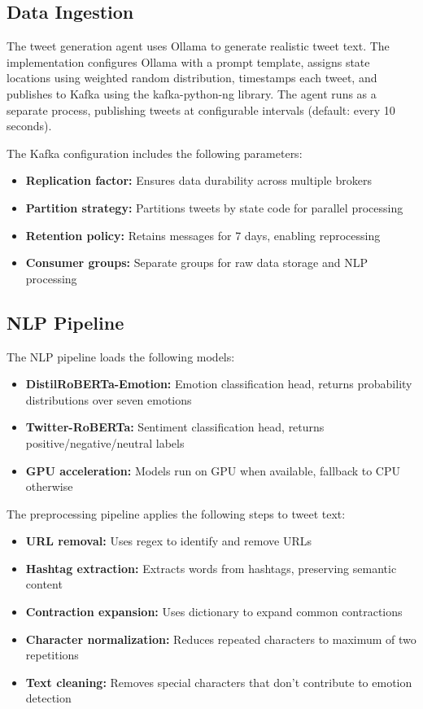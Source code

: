\subsection{Data Ingestion}

The tweet generation agent uses Ollama to generate realistic tweet text. The implementation configures Ollama with a prompt template, assigns state locations using weighted random distribution, timestamps each tweet, and publishes to Kafka using the kafka-python-ng library. The agent runs as a separate process, publishing tweets at configurable intervals (default: every 10 seconds).

The Kafka configuration includes the following parameters:

\begin{itemize}
\item \textbf{Replication factor:} Ensures data durability across multiple brokers
\item \textbf{Partition strategy:} Partitions tweets by state code for parallel processing
\item \textbf{Retention policy:} Retains messages for 7 days, enabling reprocessing
\item \textbf{Consumer groups:} Separate groups for raw data storage and NLP processing
\end{itemize}

\subsection{NLP Pipeline}

The NLP pipeline loads the following models:

\begin{itemize}
\item \textbf{DistilRoBERTa-Emotion:} Emotion classification head, returns probability distributions over seven emotions
\item \textbf{Twitter-RoBERTa:} Sentiment classification head, returns positive/negative/neutral labels
\item \textbf{GPU acceleration:} Models run on GPU when available, fallback to CPU otherwise
\end{itemize}

The preprocessing pipeline applies the following steps to tweet text:

\begin{itemize}
\item \textbf{URL removal:} Uses regex to identify and remove URLs
\item \textbf{Hashtag extraction:} Extracts words from hashtags, preserving semantic content
\item \textbf{Contraction expansion:} Uses dictionary to expand common contractions
\item \textbf{Character normalization:} Reduces repeated characters to maximum of two repetitions
\item \textbf{Text cleaning:} Removes special characters that don't contribute to emotion detection
\end{itemize}

